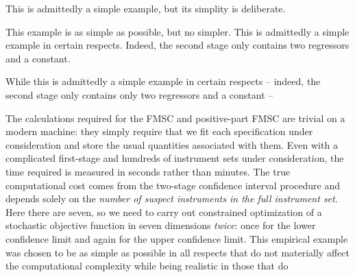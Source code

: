 This is admittedly a simple example, but its simplity is deliberate. 

This example is as simple as possible, but no simpler.
This is admittedly a simple example in certain respects.
Indeed, the second stage only contains two regressors and a constant.



While this is admittedly a simple example in certain respects -- indeed, the second stage only contains only two regressors and a constant -- 

The calculations required for the FMSC and positive-part FMSC are trivial on a modern machine: they simply require that we fit each specification under consideration and store the usual quantities associated with them.
Even with a complicated first-stage and hundreds of instrument sets under consideration, the time required is measured in seconds rather than minutes.
The true computational cost comes from the two-stage confidence interval procedure and depends solely on the \emph{number of suspect instruments in the full instrument set}.
Here there are seven, so we need to carry out constrained optimization of a stochastic objective function in seven dimensions \emph{twice}: once for the lower confidence limit and again for the upper confidence limit.
This empirical example was chosen to be as simple as possible in all respects that do not materially affect the computational complexity while being realistic in those that do